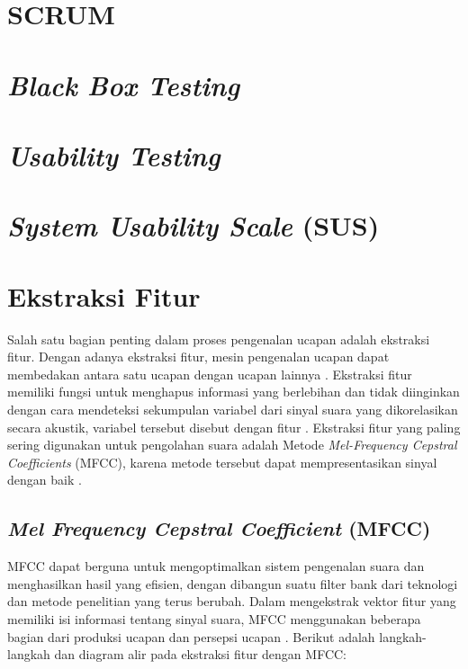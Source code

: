 \section{SCRUM}

\section{\textit{Black Box Testing}}

\section{\textit{Usability Testing}}

\section{\textit{System Usability Scale }(SUS)}

\section{Ekstraksi Fitur}
Salah satu bagian penting dalam proses pengenalan ucapan adalah ekstraksi fitur. Dengan adanya ekstraksi fitur, mesin pengenalan ucapan dapat membedakan antara satu ucapan dengan ucapan lainnya \citep{gupta2016}. Ekstraksi fitur memiliki fungsi untuk menghapus informasi yang berlebihan dan tidak diinginkan dengan cara mendeteksi sekumpulan variabel dari sinyal suara yang dikorelasikan secara akustik, variabel tersebut disebut dengan fitur \citep{dua2018}. Ekstraksi fitur yang paling sering digunakan untuk pengolahan suara adalah Metode \textit{Mel-Frequency Cepstral Coefficients} (MFCC), karena metode tersebut dapat mempresentasikan sinyal dengan baik \citep{umar2019}.

\subsection{\textit{Mel Frequency Cepstral Coefficient} (MFCC)}
\par MFCC dapat berguna untuk mengoptimalkan sistem pengenalan suara dan menghasilkan hasil yang efisien, dengan dibangun suatu filter bank dari teknologi dan metode penelitian yang terus berubah. Dalam mengekstrak vektor fitur yang memiliki isi informasi tentang sinyal suara, MFCC menggunakan beberapa bagian dari produksi ucapan dan persepsi ucapan \citep{dua2018}. Berikut adalah langkah-langkah dan diagram alir pada ekstraksi fitur dengan MFCC:

